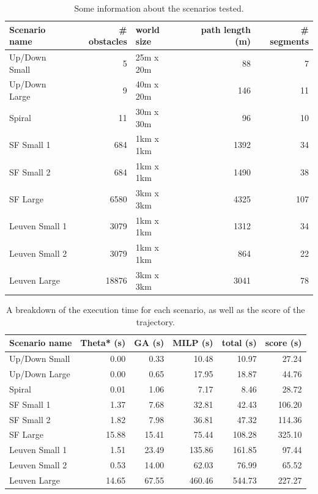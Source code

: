 \label{subsec:gen-perf}
\begin{table}[]
\centering
\begin{tabular}{ l | r | l | r | r}
Scenario name & \# obstacles & world size & path length (m)  & \# segments \\
\hline
Up/Down Small 	& 5 	& 25m x 20m 	& 88 	& 7   \\ 
Up/Down Large 	& 9 	& 40m x 20m 	& 146 	& 11  \\
Spiral		 	& 11 	& 30m x 30m 	& 96 	& 10  \\
SF Small 1		& 684 	& 1km x 1km 	& 1392 	& 34  \\
SF Small 2		& 684 	& 1km x 1km 	& 1490 	& 38  \\
SF Large	 	& 6580 	& 3km x 3km 	& 4325 	& 107 \\
Leuven Small 1 	& 3079 	& 1km x 1km 	& 1312 	& 34  \\
Leuven Small 2	& 3079 	& 1km x 1km 	& 864 	& 22  \\
Leuven Large 	& 18876	& 3km x 3km 	& 3041 	& 78  \\
\end{tabular}
\caption{Some information about the scenarios tested.}
\label{table:gen-data}
\end{table}

\begin{table}[]
\centering
\begin{tabular}{ l | r | r | r | r || r}
Scenario name & Theta* (s) & GA (s) & MILP (s)  & total (s) & score (s) \\
\hline
Up/Down Small 	& 0.00 	& 0.33 	& 10.48 & 10.97 & 27.24	\\ 
Up/Down Large 	& 0.00 	& 0.65 	& 17.95 & 18.87 & 44.76	\\
Spiral		 	& 0.01 	& 1.06	& 7.17	& 8.46 	& 28.72	\\
SF Small 1		& 1.37 	& 7.68 	& 32.81 & 42.43 & 106.20\\
SF Small 2		& 1.82 	& 7.98	& 36.81 & 47.32 & 114.36\\
SF Large	 	& 15.88	& 15.41	& 75.44 & 108.28 & 325.10\\
Leuven Small 1 	& 1.51 	& 23.49	& 135.86& 161.85& 97.44	\\
Leuven Small 2	& 0.53 	& 14.00	& 62.03 & 76.99 & 65.52	\\
Leuven Large 	& 14.65	& 67.55	& 460.46 & 544.73 & 227.27\\
\end{tabular}
\caption{A breakdown of the execution time for each scenario, as well as the score of the trajectory.}
\label{table:gen-results}
\end{table}


